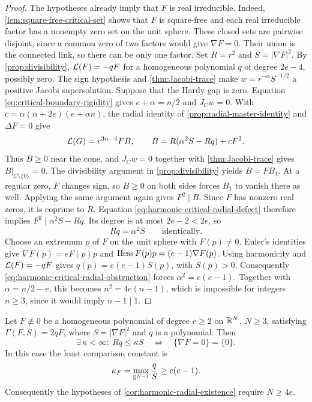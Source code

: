 \begin{proof}
The hypotheses already imply that $F$ is real irreducible.
Indeed, \cref{lem:square-free-critical-set} shows that $F$ is
square-free and each real irreducible factor has a nonempty zero
set on the unit sphere. These closed sets are pairwise disjoint,
since a common zero of two factors would give $\nabla F=0$.
Their union is the connected link, so there can be only one factor.
Set $R=r^2$ and $S=|\nabla F|^2$.
By \cref{prop:divisibility}, $\mathcal L(F)=-qF$ for a homogeneous
polynomial $q$ of degree $2e-4$, possibly zero.
The sign hypothesis and \cref{thm:Jacobi-trace} make
$w=r^{-\alpha}S^{-1/2}$ a positive Jacobi supersolution.
Suppose that the Hardy gap is zero. Equation
\eqref{eq:critical-boundary-rigidity} gives
$e+\alpha=n/2$ and $J_Cw=0$.
With $c=\alpha(\alpha+2e)(e+\alpha n)$, the radial identity
of \cref{prop:radial-master-identity} and $\Delta F=0$ give
\begin{equation}\label{eq:harmonic-critical-radial-defect}
 \mathcal L(G)=r^{3\alpha-4}FB,\qquad
 B=R(\alpha^2S-Rq)+cF^2.
\end{equation}
Thus $B\ge0$ near the cone, and $J_Cw=0$ together with
\cref{thm:Jacobi-trace} gives $B|_{C\setminus\{0\}}=0$.
The divisibility argument in \cref{prop:divisibility} yields
$B=FB_1$. At a regular zero, $F$ changes sign, so $B\ge0$
on both sides forces $B_1$ to vanish there as well.
Applying the same argument again gives $F^2\mid B$.
Since $F$ has nonzero real zeros, it is coprime to $R$.
Equation \eqref{eq:harmonic-critical-radial-defect} therefore implies
$F^2\mid\alpha^2S-Rq$. Its degree is at most $2e-2<2e$, so
\begin{equation}\label{eq:harmonic-critical-radial-obstruction}
 Rq=\alpha^2S\qquad\text{identically}.
\end{equation}
Choose an extremum $p$ of $F$ on the unit sphere with $F(p)\ne0$.
Euler's identities give
$\nabla F(p)=eF(p)p$ and
$\operatorname{Hess} F(p)p=(e-1)\nabla F(p)$.
Using harmonicity and $\mathcal L(F)=-qF$ gives
$q(p)=e(e-1)S(p)$, with $S(p)>0$.
Consequently \eqref{eq:harmonic-critical-radial-obstruction}
forces $\alpha^2=e(e-1)$.
Together with $\alpha=n/2-e$, this becomes $n^2=4e(n-1)$,
which is impossible for integers $n\ge3$, since it would imply
$n-1\mid1$.
\end{proof}

\begin{proposition}
\label{prop:harmonic-global-comparison}
Let \(F\not\equiv0\) be a homogeneous polynomial of degree \(e\ge2\)
on \(\mathbb R^N\), \(N\ge3\), satisfying
\(\Gamma(F,S)=2qF\), where \(S=|\nabla F|^2\) and \(q\) is a
polynomial. Then
\begin{equation}\label{eq:global-comparison-regularity}
 \exists\,\kappa<\infty:\ Rq\le\kappa S
 \quad\Longleftrightarrow\quad
 \{\nabla F=0\}=\{0\}.
\end{equation}
In this case the least comparison constant is
\begin{equation}\label{eq:harmonic-optimal-comparison}
 \kappa_F=\max_{\mathbb S^{N-1}}\frac qS\ge e(e-1).
\end{equation}
Consequently the hypotheses of
\cref{cor:harmonic-radial-existence} require \(N\ge4e\).
\end{proposition}

